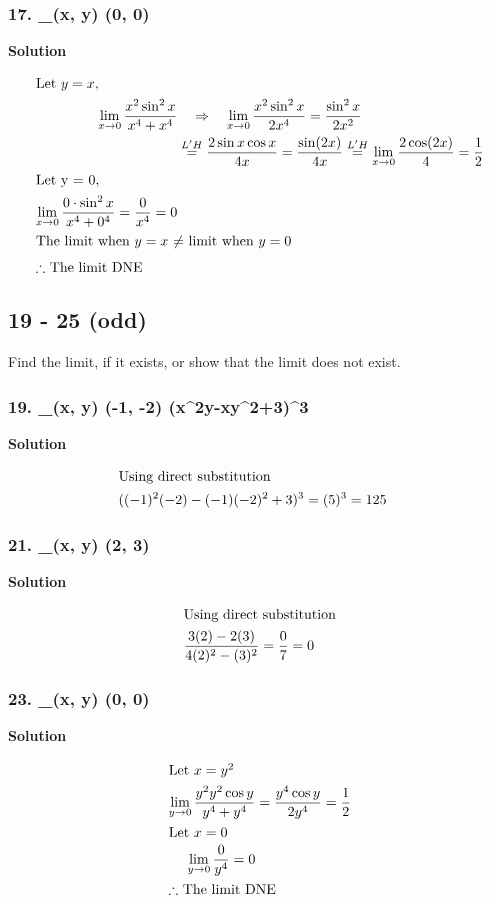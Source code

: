 \documentclass{article}
\newcommand\rr{\quad\Rightarrow\quad}
\newcommand{\limit}[4]{\lim_{(#1, #2) \to (#3, #4)}}
\newcommand{\limi}[2]{\lim_{#1 \to #2}}
\newcommand{\lh}{\overset{L'H}{=}}
\begin{document}
\subsubsection*{17. \limit x y 0 0 \displaystyle{}}
\centerline{\textbf{Solution}}
\begin{align*}
    \intertext{Let $y = x$, } 
    \limi x 0 \displaystyle\frac{x^2\sin^2x}{x^4+x^4} &\rr \limi x 0 \displaystyle\frac{x^2\sin^2x}{2x^4} = \displaystyle\frac{\sin^2 x}{2x^2} \\
                                                      &\lh \displaystyle\frac{2\sin x\cos x}{4x} = \displaystyle\frac{\sin (2x)}{4x} \lh \limi x 0 \displaystyle\frac{2\cos (2x)}{4} = \frac 1 2 \\
    \intertext{Let y = 0,}
    \limi x 0 \displaystyle\frac{0 \cdot \sin^2x}{x^4 + 0^4} = \frac 0 {x^4} = 0 \\
    \intertext{The limit when $y=x$ $\neq$ limit when $y=0$}
    \intertext{$\therefore$ The limit DNE}
\end{align*}
\subsection*{19 - 25 (odd)}
Find the limit, if it exists, or show that the limit does not exist.
\subsubsection*{19. \limit x y {-1} {-2} (x^2y-xy^2+3)^3}
\centerline{\textbf{Solution}}
\begin{align*}
    \intertext{Using direct substitution}
    ((-1)^2(-2) - (-1)(-2)^2 + 3)^3 &= (5)^3 = 125
\end{align*}
\subsubsection*{21. \limit x y 2 3 \displaystyle{}}
\centerline{\textbf{Solution}}
\begin{align*}
    \intertext{Using direct substitution}
    \displaystyle\frac{3(2) - 2(3)}{4(2)^2 - (3)^2} &= \displaystyle\frac{0}{7} = 0
\end{align*}
\subsubsection*{23. \limit x y 0 0 \displaystyle{}}
\centerline{\textbf{Solution}}
\begin{align*}
    \intertext{Let $x = y^2$}
    \limi y 0 \displaystyle\frac{y^2y^2 \cos y}{y^4 + y^4} &= \displaystyle\frac{y^4\cos y}{2y^4} = \frac 1 2 \\
    \intertext{Let $x = 0$} 
    \limi y 0 \displaystyle\frac{0}{y^4} = 0 \\
    \intertext{$\therefore$ The limit DNE}
\end{align*}
\end{document}
